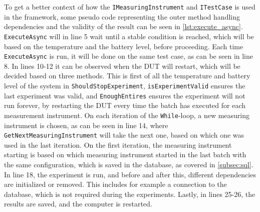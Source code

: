 To get a better context of how the \texttt{IMeasuringInstrument} and \texttt{ITestCase} is used in the framework, some pseudo code representing the outer method handling dependencies and the validity of the result can be seen in \cref{lst:execute_async}. \texttt{ExecuteAsync} will in line 5 wait until a stable condition is reached, which will be based on the temperature and the battery level, before proceeding. Each time \texttt{ExecuteAsync} is run, it will be done on the same test case, as can be seen in line 8. In lines 10-12 it can be observed when the DUT will restart, which will be decided based on three methods. This is first of all the temperature and battery level of the system in \texttt{ShouldStopExperiment}, \texttt{isExperimentValid} ensures the last experiment was valid, and \texttt{EnoughEntires} ensures the experiment will not run forever, by restarting the DUT every time the batch has executed for each measurement instrument. On each iteration of the \texttt{While}-loop, a new measuring instrument is chosen, as can be seen in line 14, where \texttt{GetNextMeasuringInstrument} will take the next one, based on which one was used in the last iteration. On the first iteration, the measuring instrument starting is based on which measuring instrument started in the last batch with the same configuration, which is saved in the database, as covered in \cref{subsec:sql}. In line 18, the experiment is run, and before and after this, different dependencies are initialized or removed. This includes for example a connection to the database, which is not required during the experiments. Lastly, in lines 25-26, the results are saved, and the computer is restarted. 




